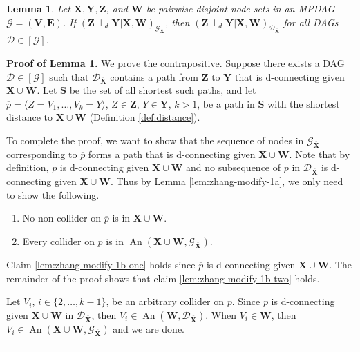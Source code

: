 \documentclass[11pt]{article}
\DeclareMathOperator{\An}{An}
\newcommand{\BlackBox}{\rule{1.5ex}{1.5ex}}  %
\newtheorem{lemma}[theorem]{Lemma}
\newcommand{\mb}[1]{\mathbf{#1}}
\newcommand{\dsepp}{\perp_{d}}
\newcommand{\g}[1][G]{\mathcal{#1}}
\newenvironment{proofof}[1][]{\noindent \textbf{Proof of #1.}}{\hfill\BlackBox}
\begin{document}

\begin{lemma}
\label{lem:zhang-modify-1b}
    Let $\mb{X,Y,Z}$, and $\mb{W}$ be pairwise disjoint node sets in an MPDAG $\g = (\mb{V,E})$. If $(\mb{Z} \dsepp \mb{Y} |\mb{X}, \mb{W})_{\g_{\overline{\mb{X}}}}$, then $(\mb{Z} \dsepp \mb{Y} |\mb{X}, \mb{W})_{\g[D]_{\overline{\mb{X}}}}$ for all DAGs $\g[D] \in [\g]$.
\end{lemma}

\begin{proofof}[Lemma \ref{lem:zhang-modify-1b}]
    We prove the contrapositive. Suppose there exists a DAG $\g[D] \in [\g]$ such that $\g[D]_{\overline{\mb{X}}}$ contains a path from $\mb{Z}$ to $\mb{Y}$ that is d-connecting given $\mb{X} \cup \mb{W}$. Let $\mb{S}$ be the set of all shortest such paths, and let $\overline{p} = \langle Z=V_1, \dots, V_k=Y \rangle$, $Z \in \mb{Z}$, $Y \in \mb{Y}$, $k >1$, be a path in $\mb{S}$ with the shortest distance to $\mb{X} \cup \mb{W}$ (Definition \ref{def:distance}).

    To complete the proof, we want to show that the sequence of nodes in $\g_{\overline{\mb{X}}}$ corresponding to $\overline{p}$ forms a path that is d-connecting given $\mb{X} \cup \mb{W}$. Note that by definition, $\overline{p}$ is d-connecting given $\mb{X} \cup \mb{W}$ and no subsequence of $\overline{p}$ in $\g[D]_{\overline{\mb{X}}}$ is d-connecting given $\mb{X} \cup \mb{W}$. Thus by Lemma \ref{lem:zhang-modify-1a}, we only need to show the following.
    \begin{enumerate}[label=(\roman*)]
        \item\label{lem:zhang-modify-1b-one}
        No non-collider on $\overline{p}$ is in $\mb{X} \cup \mb{W}$.
        
        \item\label{lem:zhang-modify-1b-two}
        Every collider on $\overline{p}$ is in $\An(\mb{X} \cup \mb{W}, \g_{\overline{\mb{X}}})$.
    \end{enumerate}
    Claim \ref{lem:zhang-modify-1b-one} holds since $\overline{p}$ is d-connecting given $\mb{X} \cup \mb{W}$. The remainder of the proof shows that claim \ref{lem:zhang-modify-1b-two} holds.

    Let $V_i$, $i \in \{2, \dots, k-1\}$, be an arbitrary collider on $\overline{p}$. Since $\overline{p}$ is d-connecting given $\mb{X} \cup \mb{W}$ in $\g[D]_{\overline{\mb{X}}}$, then $V_i \in \An(\mb{W}, \g[D]_{\overline{\mb{X}}})$. When $V_i \in \mb{W}$, then $V_i \in \An(\mb{X} \cup \mb{W}, \g_{\overline{\mb{X}}})$ and we are done.
    

\end{proofof}
\end{document}
